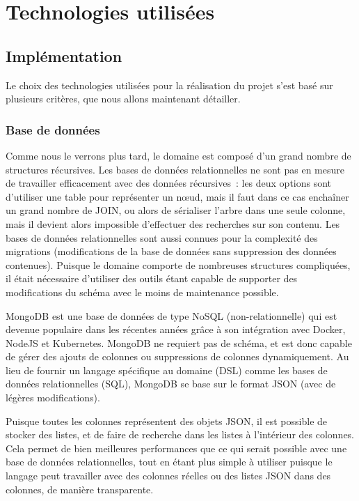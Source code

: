 \documentclass[11pt,french]{memoir}
\begin{document}
	\section{Technologies utilisées}\label{sec:technologies-utilisees}

	\subsection{Implémentation}\label{subsec:livrables-et-developpement}

	Le choix des technologies utilisées pour la réalisation du projet s’est basé sur plusieurs critères, que nous allons maintenant détailler.

	\subsubsection{Base de données}

	Comme nous le verrons plus tard, le domaine est composé d’un grand nombre de structures récursives.
	Les bases de données relationnelles ne sont pas en mesure de travailler efficacement avec des données récursives~: les deux options sont d’utiliser une table pour représenter un nœud, mais il faut dans ce cas enchaîner un grand nombre de JOIN, ou alors de sérialiser l’arbre dans une seule colonne, mais il devient alors impossible d’effectuer des recherches sur son contenu.
	Les bases de données relationnelles sont aussi connues pour la complexité des migrations (modifications de la base de données sans suppression des données contenues).
	Puisque le domaine comporte de nombreuses structures compliquées, il était nécessaire d’utiliser des outils étant capable de supporter des modifications du schéma avec le moins de maintenance possible.

	\uparagraph
	MongoDB est une base de données de type NoSQL (non-relationnelle) qui est devenue populaire dans les récentes années grâce à son intégration avec Docker, NodeJS et Kubernetes.
	MongoDB ne requiert pas de schéma, et est donc capable de gérer des ajouts de colonnes ou suppressions de colonnes dynamiquement.
	Au lieu de fournir un langage spécifique au domaine (DSL) comme les bases de données relationnelles (SQL), MongoDB se base sur le format JSON (avec de légères modifications).

	Puisque toutes les colonnes représentent des objets JSON, il est possible de stocker des listes, et de faire de recherche dans les listes à l’intérieur des colonnes.
	Cela permet de bien meilleures performances que ce qui serait possible avec une base de données relationnelles, tout en étant plus simple à utiliser puisque le langage peut travailler avec des colonnes réelles ou des listes JSON dans des colonnes, de manière transparente.
\end{document}
